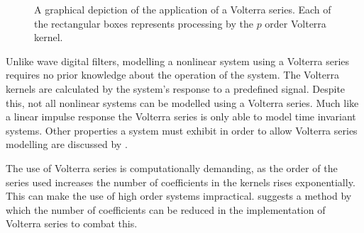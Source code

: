 			\begin{figure}[h!]
				\centering
				\caption{A graphical depiction of the application of a Volterra series. Each of the
					rectangular boxes represents processing by the $p$ order Volterra
					kernel.}
				\label{fig:VolterraModel}
			\end{figure}

			Unlike wave digital filters, modelling a nonlinear system using a Volterra series requires no prior
			knowledge about the operation of the system. The Volterra kernels are calculated by the system's
			response to a predefined signal. Despite this, not all nonlinear systems can be modelled using a
			Volterra series. Much like a linear impulse response the Volterra series is only able to model time
			invariant systems. Other properties a system must exhibit in order to allow Volterra series
			modelling are discussed by \citet{billings2013nonlinear}.

			The use of Volterra series is computationally demanding, as the order of the series used increases
			the number of coefficients in the kernels rises exponentially. This can make the use of high order
			systems impractical. \citet{reed1996practical} suggests a method by which the number of
			coefficients can be reduced in the implementation of Volterra series to combat this.

